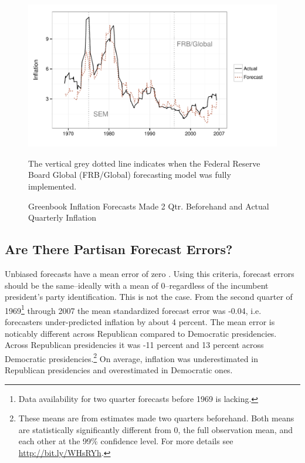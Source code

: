 \documentclass[a4paper]{article}\usepackage{graphicx, color}
\newenvironment{knitrout}{}{} %
\begin{document}
\begin{figure}[t]
    \caption{Greenbook Inflation Forecasts Made 2 Qtr. Beforehand and Actual Quarterly Inflation}
    \label{absolute}
    \begin{center}
    
\begin{knitrout}
\color{fgcolor}

{\centering \includegraphics[width=0.8\linewidth]{figure/BaseInflation} 

}



\end{knitrout}

    
    \end{center}
    \begin{singlespace}
        {\scriptsize{The vertical grey dotted line indicates when the Federal Reserve Board Global (FRB/Global) forecasting model was fully implemented.  
                      }}
    \end{singlespace}
\end{figure}


\subsection{Are There Partisan Forecast Errors?}




Unbiased forecasts have a mean error of zero \citep[5]{Bruck2006}. Using this criteria, forecast errors should be the same--ideally with a mean of 0--regardless of the incumbent president's party identification. This is not the case. From the second quarter of 1969\footnote{Data availability for two quarter forecasts before 1969 is lacking.} through 2007 the mean standardized forecast error was -0.04, i.e. forecasters under-predicted inflation by about 4 percent. The mean error is noticably different across Republican compared to Democratic presidencies. Across Republican presidencies it was -11 percent and 13 percent across Democratic presidencies.\footnote{These means are from estimates made two quarters beforehand. Both means are statistically significantly different from 0, the full observation mean, and each other at the 99\% confidence level. For more details see \url{http://bit.ly/WHsRYh}.} On average, inflation was underestimated in Republican presidencies and overestimated in Democratic ones.
\end{document}
